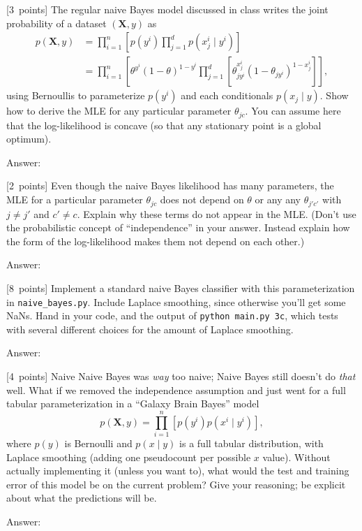 \documentclass{article}
\newcommand{\ask}[1]{\textcolor{question}{#1}}
\newenvironment{answer}{\par\begingroup\color{answer}Answer: }{\endgroup}
\newcommand{\pts}[1]{\textcolor{points}{[#1~points]}}
\newcommand{\TODO}{\color{red}{TODO}}
\newcommand{\bX}{\mathbf{X}}
\begin{document}
\begin{qlist}
\item \pts{3}
    The regular naive Bayes model discussed in class writes the joint probability of a dataset $(\bX, y)$ as
    \begin{align*}
       p(\bX, y)
    &= \prod_{i=1}^n \left[p(y^i) \prod_{j=1}^d p(x_j^i \mid y^i)\right]\\
    &= \prod_{i=1}^n \left[
            \theta^{y^i} (1-\theta)^{1-y^i}
            \prod_{j=1}^d \left[ \theta_{j y^i}^{x_j^i} (1-\theta_{j y^i})^{1 - x_j^i} \right]
       \right]
    ,\end{align*}
    using Bernoullis to parameterize $p(y^i)$ and each conditionals $p(x_j \mid y)$.
    \ask{Show how to derive the MLE for any particular parameter $\theta_{jc}$.}
    You can assume here that the log-likelihood is concave (so that any stationary point is a global optimum).
\begin{answer}\TODO\end{answer}


\item \pts{2}
    Even though the naive Bayes likelihood has many parameters,
    the MLE for a particular parameter $\theta_{jc}$ does not depend on $\theta$ or any any $\theta_{j'c'}$ with $j\neq j'$ and $c' \neq c$.
    \ask{Explain why these terms do not appear in the MLE.}
    (Don't use the probabilistic concept of ``independence'' in your answer. Instead explain how the form of the log-likelihood makes them not depend on each other.)

\begin{answer}\TODO\end{answer}


\item \pts{8}
    Implement a standard naive Bayes classifier with this parameterization in \texttt{naive\_bayes.py}. 
    Include Laplace smoothing, since otherwise you'll get some NaNs.
    \ask{Hand in your code, and the output of \texttt{python main.py 3c}, which tests with several different choices for the amount of Laplace smoothing.}

\begin{answer}\TODO\end{answer}

\item \pts{4}
    Naive Naive Bayes was \emph{way} too naive;
    Naive Bayes still doesn't do \emph{that} well.
    What if we removed the independence assumption and just went for a full tabular parameterization in a ``Galaxy Brain Bayes'' model
    \[ p(\bX, y) = \prod_{i=1}^n \left[ p(y^i) p(x^i \mid y^i) \right] ,\]
    where $p(y)$ is Bernoulli and $p(x \mid y)$ is a full tabular distribution,
    with Laplace smoothing (adding one pseudocount per possible $x$ value).
    Without actually implementing it (unless you want to),
    \ask{what would the test and training error of this model be on the current problem?}
    Give your reasoning; be explicit about what the predictions will be.

\begin{answer}\TODO\end{answer}

\end{qlist}
\end{document}
